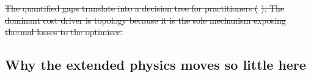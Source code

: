 \documentclass[a4paper,fleqn]{cas-sc} %
\providecommand{\DIFdel}[1]{{\protect\color{red}\sout{#1}}} %
\providecommand{\DIFaddbegin}{} %
\providecommand{\DIFaddend}{} %
\providecommand{\DIFdelbegin}{} %
\providecommand{\DIFdelend}{} %
\providecommand{\Cref}[1]{\ref{#1}}
\begin{document}
{\DIFdelbegin %

\DIFdel{The quantified gaps translate into a decision tree for practitioners (}%
\DIFdel{). The dominant cost driver is topology because it is the sole mechanism exposing thermal losses
to the optimiser. }\DIFdelend \DIFaddbegin {
\subsection{Why the extended physics moves so little here}
\label{subsec:whynull}
\DIFaddend 

}}
\end{document}

